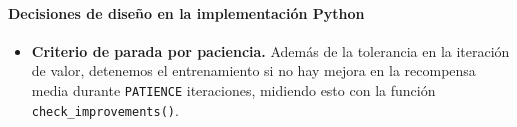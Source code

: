 \paragraph*{Decisiones de diseño en la implementación Python}
\begin{itemize}
  \item \textbf{Criterio de parada por paciencia.} Además de la tolerancia en la iteración de valor, detenemos el entrenamiento si no hay mejora en la recompensa media durante \texttt{PATIENCE} iteraciones, midiendo esto con la función \texttt{check\_improvements()}.
\end{itemize}
